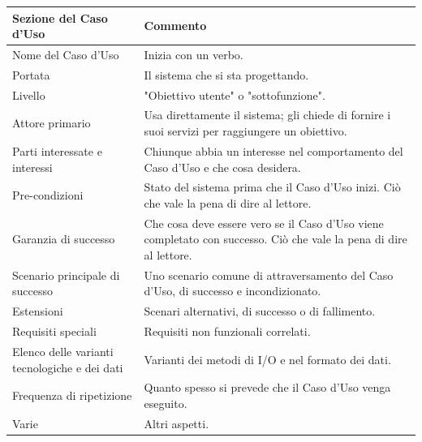 
\begin{center}
    \begin{tabular}{ || >{\columncolor{mgray}}p{8cm} | >{\columncolor{GreenPastel}}p{8cm} ||}
    \hline\hline
        \rowcolor{lightgray}
    \textbf{Sezione del Caso d'Uso}& \textbf{\textcolor{dkgreen}{Commento}}\\ \hline
    \hline
        Nome del Caso d'Uso & Inizia con un verbo. \\\hline

        Portata & Il sistema che si sta progettando. \\\hline

        Livello & "Obiettivo utente" o "sottofunzione". \\\hline

        Attore primario & Usa direttamente il sistema; gli chiede
        di fornire i suoi servizi per raggiungere un obiettivo. \\\hline

        Parti interessate e interessi & Chiunque abbia un interesse nel comportamento del Caso d'Uso e che cosa desidera. \\\hline

        Pre-condizioni & Stato del sistema prima che il Caso d'Uso inizi. Ciò che vale la pena di dire al lettore. \\\hline

        Garanzia di successo & Che cosa deve essere vero se il Caso d'Uso viene completato con successo. Ciò che vale la pena di dire al lettore. \\\hline  

        Scenario principale di successo & Uno scenario comune di attraversamento del Caso d'Uso, di successo e incondizionato. \\\hline

        Estensioni & Scenari alternativi, di successo o di fallimento. \\\hline

        Requisiti speciali & Requisiti non funzionali correlati. \\\hline

        Elenco delle varianti tecnologiche e dei dati & Varianti dei metodi di I/O e nel formato dei dati. \\\hline

        Frequenza di ripetizione & Quanto spesso si prevede che il Caso d'Uso venga eseguito. \\\hline

        Varie & Altri aspetti. \\\hline

        \hline

    \end{tabular}
\end{center}


